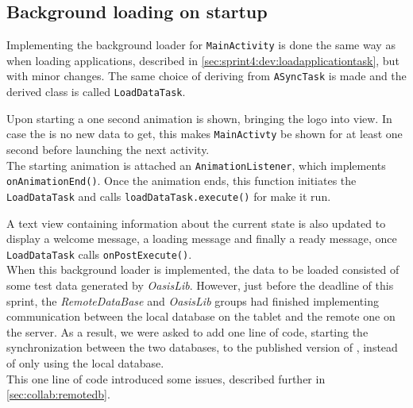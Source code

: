 \subsection{Background loading on startup}\label{sec:sprint4:dev:remotedbandbgloading}

Implementing the background loader for \lstinline|MainActivity| is done the same way as when loading applications, described in \cref{sec:sprint4:dev:loadapplicationtask}, but with minor changes.
The same choice of deriving from \lstinline!ASyncTask! is made and the derived class is called \lstinline!LoadDataTask!.

Upon starting \launcher a one second animation is shown, bringing the logo into view.
In case the is no new data to get, this makes \lstinline!MainActivty! be shown for at least one second before launching the next activity.\\

The starting animation is attached an \lstinline!AnimationListener!, which implements \lstinline|onAnimationEnd()|.
Once the animation ends, this function initiates the \lstinline!LoadDataTask! and calls \lstinline!loadDataTask.execute()! for make it run.

A text view containing information about the current state is also updated to display a welcome message, a loading message and finally a ready message, once \lstinline|LoadDataTask| calls \lstinline|onPostExecute()|.\\

When this background loader is implemented, the data to be loaded consisted of some test data generated by \textit{OasisLib}.
However, just before the deadline of this sprint, the \textit{RemoteDataBase} and \textit{OasisLib} groups had finished implementing communication between the local database on the tablet and the remote one on the server.
As a result, we were asked to add one line of code, starting the synchronization between the two databases, to the published version of \launcher, instead of only using the local database.\\

This one line of code introduced some issues, described further in \cref{sec:collab:remotedb}.
